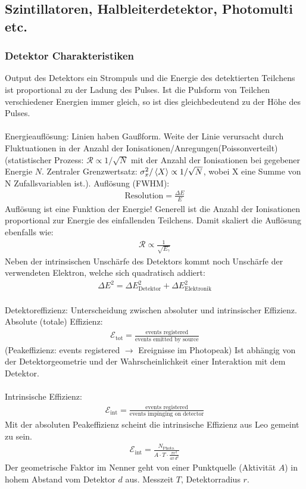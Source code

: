\documentclass[11pt, a4paper]{article}
\numberwithin{equation}{section}
\begin{document}
\subsection{Szintillatoren, Halbleiterdetektor, Photomulti etc.}

\subsubsection{Detektor Charakteristiken}
Output des Detektors ein Strompuls und die Energie des detektierten Teilchens ist proportional zu der Ladung des Pulses.
Ist die Pulsform von Teilchen verschiedener Energien immer gleich, so ist dies gleichbedeutend zu der Höhe des Pulses.\\
\\
Energieauflösung: Linien haben Gaußform. Weite der Linie verursacht durch Fluktuationen in der Anzahl der Ionisationen/Anregungen(Poissonverteilt) (statistischer Prozess: $\mathcal{R} \propto 1 / \sqrt{N}$ mit der Anzahl der Ionisationen bei gegebener Energie $N$. Zentraler Grenzwertsatz: $\sigma_x^2 / \braket{X} \propto 1 / \sqrt{N}$, wobei X eine Summe von N Zufallsvariablen ist.).
Auflösung (FWHM):
\begin{align}
	\text{Resolution} = \frac{\Delta E}{E}
\end{align}
Auflösung ist eine Funktion der Energie! Generell ist die Anzahl der Ionisationen proportional zur Energie des einfallenden Teilchens. Damit skaliert die Auflösung ebenfalls wie:
\begin{align}
	\mathcal{R} \propto \frac{1}{\sqrt{E_\gamma}}
\end{align}
Neben der intrinsischen Unschärfe des Detektors kommt noch Unschärfe der verwendeten Elektron, welche sich quadratisch addiert:
\begin{align}
	\Delta E^2 = \Delta E_\mathrm{Detektor}^2 + \Delta E_\mathrm{Elektronik}^2
\end{align}
\\
Detektoreffizienz: Unterscheidung zwischen absoluter und intrinsischer Effizienz.\\
Absolute (totale) Effizienz:
\begin{align}
	\mathcal{E}_\mathrm{tot} = \frac{\text{events registered}}{\text{events emitted by source}}
\end{align}
(Peakeffizienz: events registered $\rightarrow$ Ereignisse im Photopeak) 
Ist abhängig von der Detektorgeometrie und der Wahrscheinlichkeit einer Interaktion mit dem Detektor.\\
\\
Intrinsische Effizienz:
\begin{align}
	\mathcal{E}_\mathrm{int} = \frac{\text{events registered}}{\text{events impinging on detector}}
\end{align}
Mit der absoluten Peakeffizienz scheint die intrinsische Effizienz aus Leo gemeint zu sein.
\begin{align}
	\label{eq:peakeffizienz}
	\mathcal{E}_\mathrm{int} = \frac{N_\mathrm{Photo.}}{A \cdot T \cdot \frac{\pi r^2}{4\pi \, d^2}}
\end{align}
Der geometrische Faktor im Nenner geht von einer Punktquelle (Aktivität $A$) in hohem Abstand vom Detektor $d$ aus. Messzeit $T$, Detektorradius $r$.
\end{document}

